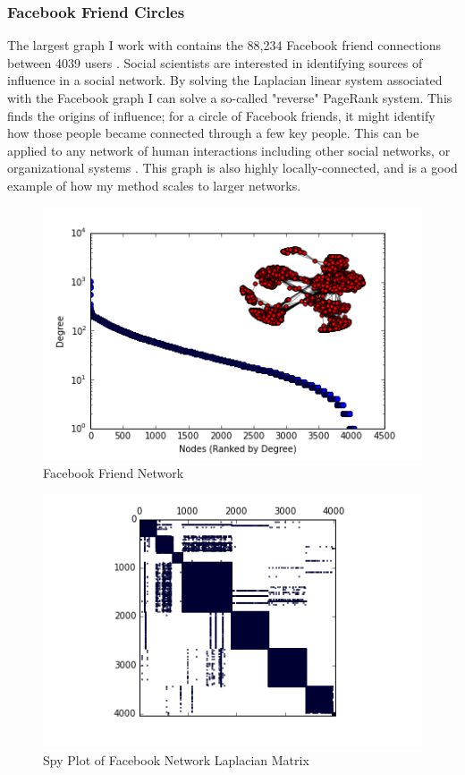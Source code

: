 \documentclass{article}
\begin{document}
\subsubsection{Facebook Friend Circles}
The largest graph I work with contains the 88,234 Facebook friend connections between 4039 users  \cite{Mcauley:2012}. Social scientists are interested in identifying sources of influence in a social network. By solving the Laplacian linear system associated with the Facebook graph I can solve a so-called "reverse" PageRank system. This finds the origins of influence; for a circle of Facebook friends, it might identify how those people became connected through a few key people. This can be applied to any network of human interactions including other social networks, or organizational systems \cite{Gleich:2015}. This graph is also highly locally-connected, and is a good example of how my method scales to larger networks.

\begin{figure}
\centering

\includegraphics[width=\linewidth]{fb_degree_histogram.png}
\caption{Facebook Friend Network}
  
\end{figure}

\begin{figure}
\centering
\includegraphics[width = \linewidth]{fbspy.png}
\caption{Spy Plot of Facebook Network Laplacian Matrix}
\end{figure}
\end{document}
